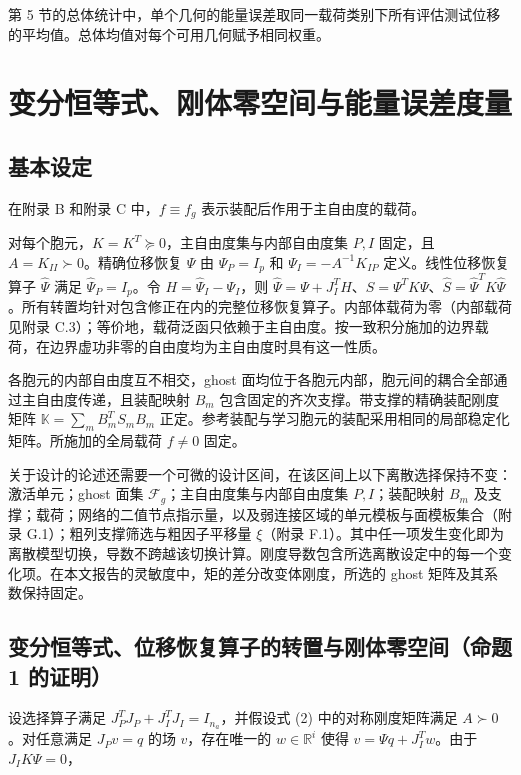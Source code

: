 \documentclass[preprint,12pt,authoryear]{elsarticle}
\begin{document}
第 5 节的总体统计中，单个几何的能量误差取同一载荷类别下所有评估测试位移的平均值。总体均值对每个可用几何赋予相同权重。

\section{变分恒等式、刚体零空间与能量误差度量}

\subsection{基本设定}

在附录 B 和附录 C 中，\(f\equiv f_g\) 表示装配后作用于主自由度的载荷。

对每个胞元，\(K=K^T\succeq0\)，主自由度集与内部自由度集 \(P,I\) 固定，且 \(A=K_{II}\succ0\)。精确位移恢复 \(\Psi\) 由 \(\Psi_P=I_p\) 和 \(\Psi_I=-A^{-1}K_{IP}\) 定义。线性位移恢复算子 \(\widehat\Psi\) 满足 \(\widehat\Psi_P=I_p\)。令 \(H=\widehat\Psi_I-\Psi_I\)，则 \(\widehat\Psi=\Psi+J_I^TH\)、\(S=\Psi^TK\Psi\)、\(\widehat S=\widehat\Psi^TK\widehat\Psi\)。所有转置均针对包含修正在内的完整位移恢复算子。内部体载荷为零（内部载荷见附录 C.3）；等价地，载荷泛函只依赖于主自由度。按一致积分施加的边界载荷，在边界虚功非零的自由度均为主自由度时具有这一性质。

各胞元的内部自由度互不相交，ghost 面均位于各胞元内部，胞元间的耦合全部通过主自由度传递，且装配映射 \(B_m\) 包含固定的齐次支撑。带支撑的精确装配刚度矩阵 \(\mathbb K=\sum_m B_m^TS_mB_m\) 正定。参考装配与学习胞元的装配采用相同的局部稳定化矩阵。所施加的全局载荷 \(f\ne0\) 固定。

关于设计的论述还需要一个可微的设计区间，在该区间上以下离散选择保持不变：激活单元；ghost 面集 \(\mathcal F_g\)；主自由度集与内部自由度集 \(P,I\)；装配映射 \(B_m\) 及支撑；载荷；网络的二值节点指示量，以及弱连接区域的单元模板与面模板集合（附录 G.1）；粗列支撑筛选与粗因子平移量 \(\xi\)（附录 F.1）。其中任一项发生变化即为离散模型切换，导数不跨越该切换计算。刚度导数包含所选离散设定中的每一个变化项。在本文报告的灵敏度中，矩的差分改变体刚度，所选的 ghost 矩阵及其系数保持固定。

\subsection{变分恒等式、位移恢复算子的转置与刚体零空间（命题 1 的证明）}

设选择算子满足 \(J_P^TJ_P+J_I^TJ_I=I_{n_a}\)，并假设式 (2) 中的对称刚度矩阵满足 \(A\succ0\)。对任意满足 \(J_Pv=q\) 的场 \(v\)，存在唯一的 \(w\in\mathbb R^i\) 使得 \(v=\Psi q+J_I^Tw\)。由于 \(J_IK\Psi=0\)，
\end{document}

